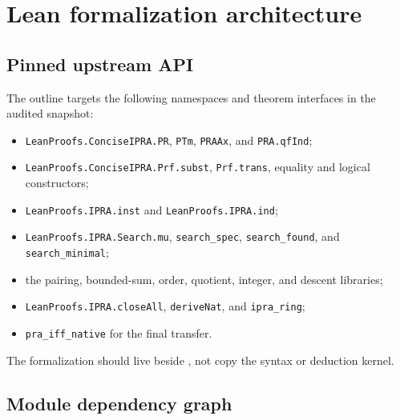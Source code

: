 \section{Lean formalization architecture}\label{sec:lean}

\subsection{Pinned upstream API}

The outline targets the following namespaces and theorem interfaces in the audited snapshot:
\begin{itemize}
  \item \texttt{LeanProofs.ConciseIPRA.PR}, \texttt{PTm}, \texttt{PRAAx}, and \texttt{PRA.qfInd};
  \item \texttt{LeanProofs.ConciseIPRA.Prf.subst}, \texttt{Prf.trans}, equality and logical constructors;
  \item \texttt{LeanProofs.IPRA.inst} and \texttt{LeanProofs.IPRA.ind};
  \item \texttt{LeanProofs.IPRA.Search.mu}, \texttt{search\_spec}, \texttt{search\_found}, and \texttt{search\_minimal};
  \item the pairing, bounded-sum, order, quotient, integer, and descent libraries;
  \item \texttt{LeanProofs.IPRA.closeAll}, \texttt{deriveNat}, and \texttt{ipra\_ring};
  \item \texttt{pra\_iff\_native} for the final transfer.
\end{itemize}
The formalization should live beside , not copy the syntax or deduction kernel.

\subsection{Module dependency graph}

